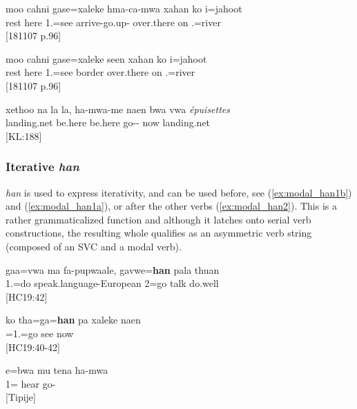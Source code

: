 \ea\label{ex:xaleke_hmaca}
\gll moo cahni gase=xaleke hma-ca-mwa xahan ko i=jahoot\\ 
 rest here 1.=see arrive-go.up- over.there on .=river\\ 
\glt {} {[181107 p.96]}
\z

\ea\label{ex:xaleke_seen}
\gll moo cahni gase=xaleke seen xahan ko i=jahoot\\ 
 rest here 1.=see border over.there on .=river\\ 
\glt {} {[181107 p.96]}
\z

\ea \label{ex:hame_naen}
\gll xethoo na la la, ha-mwa-me naen bwa vwa \textit{épuisettes}\\ 
  landing.net  be.here be.here go-- now   landing.net\\ 
\glt {} {[KL:188]}\\ 
\z

\subsubsection{Iterative \textit{han}}
\textit{han} is used to express iterativity, and can be used before, see (\ref{ex:modal_han1b}) and (\ref{ex:modal_han1a}), or after the other verbs (\ref{ex:modal_han2}). This is a rather grammaticalized function and although it latches onto serial verb constructions, the resulting whole qualifies as an asymmetric verb string (composed of an SVC and a modal verb).


\ea\label{ex:modal_han1b}
\gll gaa=vwa ma fa-pupwaale, gavwe=\textbf{han} pala thuan\\ 
 1.=do  speak.language-European 2=go talk do.well\\ 
\glt {} {[HC19:42]}
\z


\ea\label{ex:modal_han1a}
\gll ko tha=ga=\textbf{han} pa xaleke naen\\ 
  =1.=go  see now\\ 
\glt {} {[HC19:40-42]}
\z


\ea \label{ex:modal_han2}
\gll e=bwa mu tena ha-mwa\\ 
 1=  hear go-\\ 
\glt {} {[Tipije]} 
\z

